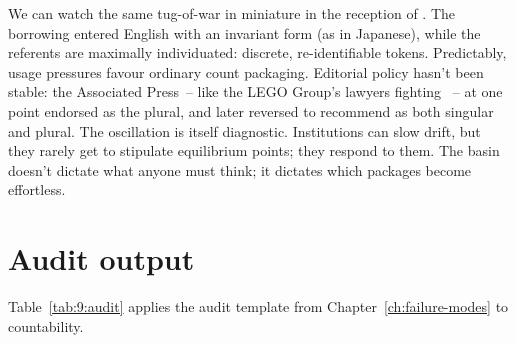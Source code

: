 We can watch the same tug-of-war in miniature in the reception of . The borrowing entered English with an invariant form (as in Japanese), while the referents are maximally individuated: discrete, re-identifiable tokens. Predictably, usage pressures favour ordinary count packaging. Editorial policy hasn't been stable: the Associated Press~-- like the LEGO Group's lawyers fighting ~-- at one point endorsed  as the plural, and later reversed to recommend  as both singular and plural. The oscillation is itself diagnostic. Institutions can slow drift, but they rarely get to stipulate equilibrium points; they respond to them. The basin doesn't dictate what anyone must think; it dictates which packages become effortless.

\section{Audit output}
\label{sec:9:audit}

Table~\ref{tab:9:audit} applies the audit template from Chapter~\ref{ch:failure-modes} to countability.

